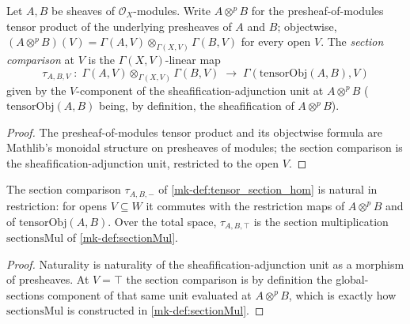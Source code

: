 \begin{definition}\label{mk-def:tensor_section_hom}
  \leanok

  Let \(A, B\) be sheaves of \(\mathcal O_X\)-modules. Write \(A \otimes^p B\)
  for the presheaf-of-modules tensor product of the underlying presheaves of
  \(A\) and \(B\); objectwise, \((A \otimes^p B)(V) = \Gamma(A,V)
  \otimes_{\Gamma(X,V)} \Gamma(B,V)\) for every open \(V\). The
  \emph{section comparison} at \(V\) is the \(\Gamma(X,V)\)-linear map
  \[
    \tau_{A,B,V} \;:\; \Gamma(A,V) \otimes_{\Gamma(X,V)} \Gamma(B,V)
    \;\longrightarrow\; \Gamma(\mathrm{tensorObj}(A,B), V)
  \]
  given by the \(V\)-component of the sheafification-adjunction unit at
  \(A \otimes^p B\) (\(\mathrm{tensorObj}(A,B)\) being, by definition, the
  sheafification of \(A \otimes^p B\)).
\end{definition}
\begin{proof}
  \leanok{}
  The presheaf-of-modules tensor product and its objectwise formula are
  Mathlib's monoidal structure on presheaves of modules; the section
  comparison is the sheafification-adjunction unit, restricted to the open
  \(V\).
\end{proof}

\begin{lemma}\label{mk-lem:tensor_section_hom_naturality}
  \leanok

  The section comparison \(\tau_{A,B,-}\) of \ref{mk-def:tensor_section_hom}
  is natural in restriction: for opens \(V \subseteq W\) it commutes with
  the restriction maps of \(A \otimes^p B\) and of \(\mathrm{tensorObj}(A,B)\).
  Over the total space, \(\tau_{A,B,\top}\) is the section multiplication
  \(\mathrm{sectionsMul}\) of \ref{mk-def:sectionMul}.
\end{lemma}
\begin{proof}
  \leanok{}
  Naturality is naturality of the sheafification-adjunction unit as a
  morphism of presheaves. At \(V = \top\) the section comparison is by
  definition the global-sections component of that same unit evaluated at
  \(A \otimes^p B\), which is exactly how \(\mathrm{sectionsMul}\) is
  constructed in \ref{mk-def:sectionMul}.
\end{proof}

